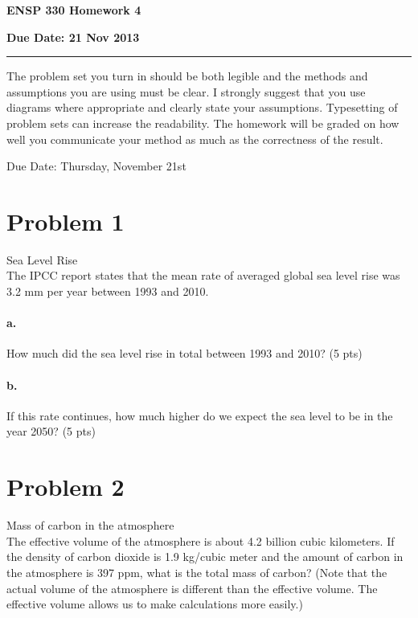 \documentclass{article}
\newif\ifsolution
\newcommand{\chead}[1]
{\begin{center}\large\textbf{#1}\end{center}}
\newcommand{\solution}[1]
{\ifsolution
\vspace{10pt}
{\color{answer-color} #1}
\else\fi}
\newcommand{\ufrac}[2]{\frac{\textrm{#1}}{\textrm{#2}}}
\begin{document}
\chead{ENSP 330 Homework 4}
\chead{Due Date: 21 Nov 2013}
\hrule
\vspace{10pt}


The problem set you turn in should be both legible and the methods and
assumptions you are using must be clear.  I strongly suggest that you
use diagrams where appropriate and clearly state your assumptions.
Typesetting of problem sets can increase the readability.  The homework
will be graded on how well you communicate your method as much as the
correctness of the result.

Due Date: Thursday, November 21st


\section*{Problem 1}

Sea Level Rise \\

The IPCC report states that the mean rate of averaged global sea level
rise was 3.2 mm per year between 1993 and 2010.

\paragraph{a.} How much did the sea level rise in total between 1993 and 2010? (5
pts)

\solution{
To get a total amount, we multiply the rate by the time.
$$ \ufrac{3.2 mm}{year} \cdot (2010 - 1993) years = 54.4 mm $$
This is 5 cm or about two inches.
}

\paragraph{b.} If this rate continues, how much higher do we expect the sea level to
be in the year 2050? (5 pts)

\solution{
We calculate the rise from this year 2013 as we did above
$$ \ufrac{3.2 mm}{year} \cdot (2050 - 2013) years =  118 mm $$
}


\section*{Problem 2}

Mass of carbon in the atmosphere \\

The effective volume of the atmosphere is about 4.2 billion cubic
kilometers.  If the density of carbon dioxide is 1.9 kg/cubic meter and
the amount of carbon in the atmosphere is 397 ppm, what is the total
mass of carbon?  (Note that the actual volume of the atmosphere is different
than the effective volume.  The effective volume allows us to make
calculations more easily.)
\end{document}
